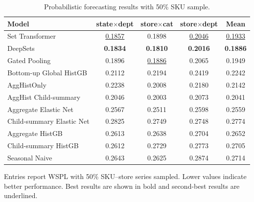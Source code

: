 \documentclass[12pt]{article}
\begin{document}
\begin{table}[H]
  \centering
  \caption{Probabilistic forecasting results with 50\% SKU sample.}
  \label{tab:appendix_quantile_50pct}
  \begin{threeparttable}
    \begin{tabular}{lcccc}
      \toprule
      Model                     & state$\times$dept  & store$\times$cat   & store$\times$dept  & Mean               \\
      \midrule
      Set Transformer                & \underline{0.1857} & 0.1898             & \underline{0.2046} & \underline{0.1933} \\
      DeepSets                       & \textbf{0.1834}    & \textbf{0.1810}    & \textbf{0.2016}    & \textbf{0.1886}    \\
      Gated Pooling                  & 0.1896             & \underline{0.1886} & 0.2065             & 0.1949             \\
      Bottom-up Global HistGB        & 0.2112             & 0.2194             & 0.2419             & 0.2242             \\
      AggHistOnly                    & 0.2238             & 0.2008             & 0.2180             & 0.2142             \\
      AggHist Child-summary          & 0.2046             & 0.2003             & 0.2073             & 0.2041             \\
      Aggregate Elastic Net          & 0.2567             & 0.2511             & 0.2598             & 0.2559             \\
      Child-summary Elastic Net      & 0.2825             & 0.2749             & 0.2748             & 0.2774             \\
      Aggregate HistGB               & 0.2613             & 0.2638             & 0.2704             & 0.2652             \\
      Child-summary HistGB           & 0.2612             & 0.2729             & 0.2773             & 0.2705             \\
      Seasonal Naive                 & 0.2643             & 0.2625             & 0.2874             & 0.2714             \\
      \bottomrule
    \end{tabular}
    \begin{tablenotes}
      \footnotesize \item Entries report WSPL with 50\% SKU--store series sampled. Lower values indicate better performance. Best results are shown in bold and second-best results are underlined.
    \end{tablenotes}
  \end{threeparttable}
\end{table}
\end{document}
